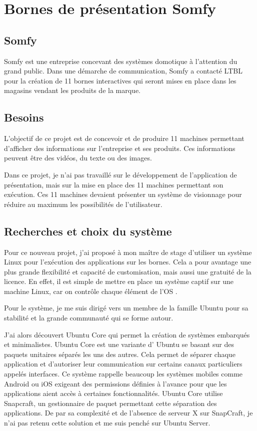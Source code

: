 \section{Bornes de présentation Somfy}

\subsection{Somfy}

Somfy est une entreprise concevant des systèmes domotique à l'attention du grand public.
Dans une démarche de communication, Somfy a contacté LTBL pour la création de 11 bornes interactives qui seront mises en place dans les magasins vendant les produits de la marque.

\subsection{Besoins}

L'objectif de ce projet est de concevoir et de produire 11 machines permettant d'afficher des informations sur l'entreprise et ses produits.
Ces informations peuvent être des vidéos, du texte ou des images.

Dans ce projet, je n'ai pas travaillé sur le développement de l'application de présentation, mais sur la mise en place des 11 machines permettant son exécution.
Ces 11 machines devaient présenter un système de visionnage pour réduire au maximum les possibilités de l'utilisateur.

\subsection{Recherches et choix du système}

Pour ce nouveau projet, j'ai proposé à mon maître de stage d'utiliser un système Linux pour l'exécution des applications sur les bornes.
Cela a pour avantage une plus grande flexibilité et capacité de customisation, mais aussi une gratuité de la licence.
En effet, il est simple de mettre en place un système captif sur une machine Linux, car on contrôle chaque élément de l'OS .

Pour le système, je me suis dirigé vers un membre de la famille Ubuntu pour sa stabilité et la grande communauté qui se forme autour.

J'ai alors découvert Ubuntu Core qui permet la création de systèmes embarqués et minimalistes.
Ubuntu Core est une variante d’ Ubuntu se basant sur des paquets unitaires séparés les uns des autres.
Cela permet de séparer chaque application et d'autoriser leur communication sur certains canaux particuliers appelés interfaces.
Ce système rappelle beaucoup les systèmes mobiles comme Android ou iOS exigeant des permissions définies à l'avance pour que les applications aient accès à certaines fonctionnalités.
Ubuntu Core utilise Snapcraft, un gestionnaire de paquet permettant cette séparation des applications.
De par sa complexité et de l'absence de serveur X sur SnapCraft, je n'ai pas retenu cette solution et me suis penché sur Ubuntu Server.

